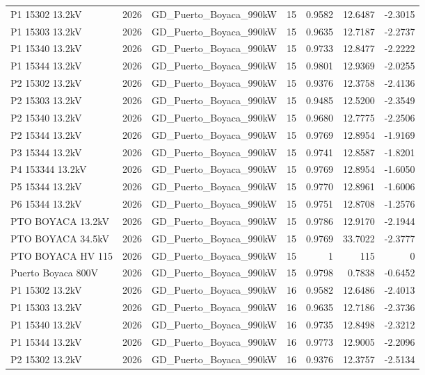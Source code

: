 \documentclass[11pt,a4paper]{article}
\begin{document}
\begin{longtable}{llllrrr}
P1 15302 13.2kV & 2026 & GD\_Puerto\_Boyaca\_990kW & 15 & 0.9582 & 12.6487 & -2.3015 \\
P1 15303 13.2kV & 2026 & GD\_Puerto\_Boyaca\_990kW & 15 & 0.9635 & 12.7187 & -2.2737 \\
P1 15340 13.2kV & 2026 & GD\_Puerto\_Boyaca\_990kW & 15 & 0.9733 & 12.8477 & -2.2222 \\
P1 15344 13.2kV & 2026 & GD\_Puerto\_Boyaca\_990kW & 15 & 0.9801 & 12.9369 & -2.0255 \\
P2 15302 13.2kV & 2026 & GD\_Puerto\_Boyaca\_990kW & 15 & 0.9376 & 12.3758 & -2.4136 \\
P2 15303 13.2kV & 2026 & GD\_Puerto\_Boyaca\_990kW & 15 & 0.9485 & 12.5200 & -2.3549 \\
P2 15340 13.2kV & 2026 & GD\_Puerto\_Boyaca\_990kW & 15 & 0.9680 & 12.7775 & -2.2506 \\
P2 15344 13.2kV & 2026 & GD\_Puerto\_Boyaca\_990kW & 15 & 0.9769 & 12.8954 & -1.9169 \\
P3 15344 13.2kV & 2026 & GD\_Puerto\_Boyaca\_990kW & 15 & 0.9741 & 12.8587 & -1.8201 \\
P4 153344 13.2kV & 2026 & GD\_Puerto\_Boyaca\_990kW & 15 & 0.9769 & 12.8954 & -1.6050 \\
P5 15344 13.2kV & 2026 & GD\_Puerto\_Boyaca\_990kW & 15 & 0.9770 & 12.8961 & -1.6006 \\
P6 15344 13.2kV & 2026 & GD\_Puerto\_Boyaca\_990kW & 15 & 0.9751 & 12.8708 & -1.2576 \\
PTO BOYACA 13.2kV & 2026 & GD\_Puerto\_Boyaca\_990kW & 15 & 0.9786 & 12.9170 & -2.1944 \\
PTO BOYACA 34.5kV & 2026 & GD\_Puerto\_Boyaca\_990kW & 15 & 0.9769 & 33.7022 & -2.3777 \\
PTO BOYACA HV 115 & 2026 & GD\_Puerto\_Boyaca\_990kW & 15 & 1 & 115 & 0 \\
Puerto Boyaca 800V & 2026 & GD\_Puerto\_Boyaca\_990kW & 15 & 0.9798 & 0.7838 & -0.6452 \\
P1 15302 13.2kV & 2026 & GD\_Puerto\_Boyaca\_990kW & 16 & 0.9582 & 12.6486 & -2.4013 \\
P1 15303 13.2kV & 2026 & GD\_Puerto\_Boyaca\_990kW & 16 & 0.9635 & 12.7186 & -2.3736 \\
P1 15340 13.2kV & 2026 & GD\_Puerto\_Boyaca\_990kW & 16 & 0.9735 & 12.8498 & -2.3212 \\
P1 15344 13.2kV & 2026 & GD\_Puerto\_Boyaca\_990kW & 16 & 0.9773 & 12.9005 & -2.2096 \\
P2 15302 13.2kV & 2026 & GD\_Puerto\_Boyaca\_990kW & 16 & 0.9376 & 12.3757 & -2.5134 \\

\end{longtable}
\end{document}
